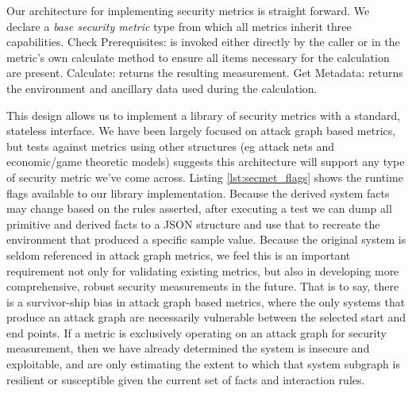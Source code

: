 Our architecture for implementing security metrics is straight forward. We declare a \textit{base security metric} type from which all metrics inherit three capabilities. Check Prerequisites: is invoked either directly by the caller or in the metric's own calculate method to ensure all items necessary for the calculation are present. Calculate: returns the resulting measurement. Get Metadata: returns the environment and ancillary data used during the calculation. 



This design allows us to implement a library of security metrics with a standard, stateless interface. We have been largely focused on attack graph based metrics, but tests against metrics using other structures (eg attack nets and economic/game theoretic models) suggests this architecture will support any type of security metric we've come across. Listing \ref{lst:secmet_flags} shows the runtime flags available to our library implementation. Because the derived system facts may change based on the rules asserted, after executing a test we can dump all primitive and derived facts to a JSON structure and use that to recreate the environment that produced a specific sample value. Because the original system is seldom referenced in attack graph metrics, we feel this is an important requirement not only for validating existing metrics, but also in developing more comprehensive, robust security measurements in the future. That is to say, there is a survivor-ship bias in attack graph based metrics, where the only systems that produce an attack graph are necessarily vulnerable between the selected start and end points. If a metric is exclusively operating on an attack graph for security measurement, then we have already determined the system is insecure and exploitable, and are only estimating the extent to which that system subgraph is resilient or susceptible given the current set of facts and interaction rules. 



